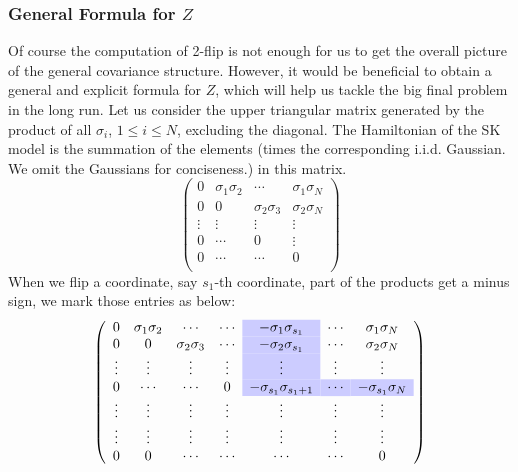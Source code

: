 \documentclass[10pt]{article}
\newcommand\y{\cellcolor{blue!20}}
\newenvironment{Proof of lemma}{\noindent{\bf Proof of Lemma}}{\hfill$\Box$\newline}
\newenvironment{Proof of claim}{\noindent{\bf Proof of claim}}{\hfill$\Box$\newline}
\newenvironment{Proof of theorem}{\noindent{\bf Proof of Theorem}}{\hfill\scriptsize{$\Box$}\newline}
\newenvironment{Proof of theorems}{\noindent{\bf Proof of Theorems}}{\hfill$\Box$\newline}
\newenvironment{Proof of proposition}{\noindent{\bf Proof of Proposition}}{\hfill$\Box$\newline}
\newenvironment{Proof of propositions}{\noindent{\bf Proof of Propositions}}{\hfill$\Box$\newline}
\newenvironment{Proof of exercise}{\noindent{\it Proof of Exercise:}}{\hfill$\Box$}
\numberwithin{equation}{section}
\begin{document}
\subsubsection{General Formula for $Z$}
Of course the computation of 2-flip is not enough for us to get the overall picture of the general covariance structure. However, it would be beneficial to obtain a general and explicit formula for $Z$, which will help us tackle the big final problem in the long run.
Let us consider the upper triangular matrix generated by the product of all $\sigma_i$, $1 \leq i \leq N$, excluding the diagonal. The Hamiltonian of the SK model is the summation of the elements (times the corresponding i.i.d. Gaussian. We omit the Gaussians for conciseness.) in this matrix.
\begin{equation}
    \left(\begin{array}{cccc}
      0  & \sigma_1 \sigma_2  & \cdots & \sigma_1 \sigma_N \\
      0  & 0  & \sigma_2 \sigma_3 & \sigma_2 \sigma_N \\
      \vdots  & \vdots   & \vdots & \vdots \\
      0  & \cdots   & 0  & \vdots \\
      0  &  \cdots  & \cdots &  0\\
    \end{array}\right)
\end{equation}
When we flip a coordinate, say $s_1$-th coordinate, part of the products get a minus sign, we mark those entries as below:
\begin{equation}
    \left(\begin{array}{ccccccc}
      0     &\sigma_1 \sigma_2  &\cdots            &\cdots &\y -\sigma_1 \sigma_{s_1}       & \cdots   & \sigma_1 \sigma_N \\
      0     &0                  &\sigma_2 \sigma_3 &\cdots &\y -\sigma_2 \sigma_{s_1} & \cdots & \sigma_2 \sigma_N \\
      \vdots&\vdots             &\vdots            &\vdots &\y \vdots               & \vdots & \vdots\\
      0     &\cdots             &\cdots            &0      &\y -\sigma_{s_1} \sigma_{s_1+1}& \y \cdots & \y -\sigma_{s_1} \sigma_{N} \\
      \vdots&\vdots             &\vdots            &\vdots & \vdots & \vdots & \vdots\\
      \vdots&\vdots             &\vdots            &\vdots & \vdots & \vdots & \vdots\\
      0     & 0                 &\cdots            &\cdots & \cdots & \cdots &  0\\
    \end{array}\right)
\end{equation}
\end{document}
